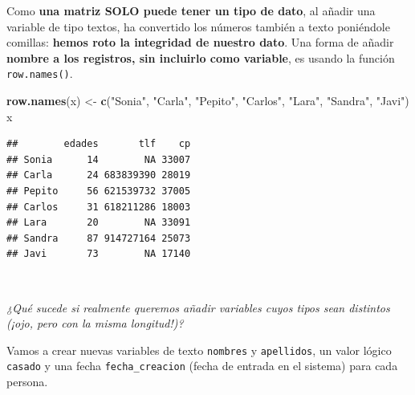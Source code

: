\documentclass[11pt,]{book}
\newenvironment{Shaded}{\begin{snugshade}}{\end{snugshade}}
\newcommand{\KeywordTok}[1]{\textcolor[rgb]{0.27,0.27,0.27}{\textbf{#1}}}
\newcommand{\NormalTok}[1]{#1}
\newcommand{\StringTok}[1]{\textcolor[rgb]{0.5,0.5,0.5}{#1}}
\begin{document}
Como \textbf{una matriz SOLO puede tener un tipo de dato}, al añadir una variable de tipo textos, ha convertido los números también a texto poniéndole comillas: \textbf{hemos roto la integridad de nuestro dato}. Una forma de añadir \textbf{nombre a los registros, sin incluirlo como variable}, es usando la función \texttt{row.names()}.

\begin{Shaded}
\begin{Highlighting}[]
\KeywordTok{row.names}\NormalTok{(x) <-}\StringTok{ }\KeywordTok{c}\NormalTok{(}\StringTok{"Sonia"}\NormalTok{, }\StringTok{"Carla"}\NormalTok{, }\StringTok{"Pepito"}\NormalTok{, }\StringTok{"Carlos"}\NormalTok{, }\StringTok{"Lara"}\NormalTok{, }\StringTok{"Sandra"}\NormalTok{, }\StringTok{"Javi"}\NormalTok{)}
\NormalTok{x}
\end{Highlighting}
\end{Shaded}

\begin{verbatim}
##        edades       tlf    cp
## Sonia      14        NA 33007
## Carla      24 683839390 28019
## Pepito     56 621539732 37005
## Carlos     31 618211286 18003
## Lara       20        NA 33091
## Sandra     87 914727164 25073
## Javi       73        NA 17140
\end{verbatim}

~

\emph{¿Qué sucede si realmente queremos añadir variables cuyos tipos sean distintos (¡ojo, pero con la misma longitud!)?}

Vamos a crear nuevas variables de texto \texttt{nombres} y \texttt{apellidos}, un valor lógico \texttt{casado} y una fecha \texttt{fecha\_creacion} (fecha de entrada en el sistema) para cada persona.
\end{document}
